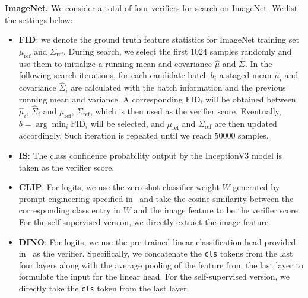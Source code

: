 \documentclass[11pt, letterpaper, logo]{googledeepmind}
\begin{document}
\textbf{ImageNet.} We consider a total of four verifiers for search on ImageNet. We list the settings below: \begin{itemize}
    \item \textbf{FID}: we denote the ground truth feature statistics for ImageNet training set $\mu_{\text{ref}}$ and $\Sigma_{\text{ref}}$. During search, we select the first $1024$ samples randomly and use them to initialize a running mean and covariance $\hat{\mu}$ and $\hat{\Sigma}$. In the following search iterations, for each candidate batch $b_i$ a staged mean $\hat{\mu}_i$ and covariance $\hat{\Sigma}_i$ are calculated with the batch information and the previous running mean and variance. A corresponding $\text{FID}_i$ will be obtained between $\hat{\mu}_i$, $\hat{\Sigma}_i$ and $\mu_{\text{ref}}$, $\Sigma_{\text{ref}}$, which is then used as the verifier score. Eventually, $b = \arg\min_i \text{FID}_i$ will be selected, and $\mu_{\text{ref}}$ and $\Sigma_{\text{ref}}$ are then updated accordingly. Such iteration is repeated until we reach $50000$ samples.
    
    \item \textbf{IS}: The class confidence probability output by the InceptionV3 model is taken as the verifier score.
    
    \item \textbf{CLIP}: For logits, we use the zero-shot classifier weight $W$ generated by prompt engineering specified in~\citet{radford2021learning} and take the cosine-similarity between the corresponding class entry in $W$ and the image feature to be the verifier score. For the self-supervised version, we directly extract the image feature.
    
    \item \textbf{DINO}: For logits, we use the pre-trained linear classification head provided in~\citet{oquab2023dinov2} as the verifier. Specifically, we concatenate the \texttt{cls} tokens from the last four layers along with the average pooling of the feature from the last layer to formulate the input for the linear head. For the self-supervised version, we directly take the \texttt{cls} token from the last layer.
\end{itemize}
\end{document}
